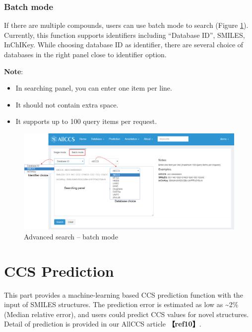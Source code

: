 \documentclass[12pt,]{book}
\providecommand{\tightlist}{%
  \setlength{\itemsep}{0pt}\setlength{\parskip}{0pt}}
\begin{document}
\subsection{Batch mode}\label{chapter2d3d2}

If there are multiple compounds, users can use batch mode to search
(Figure \ref{fig:figure2d9}). Currently, this function supports
identifiers including ``Database ID'', SMILES, InChIKey. While choosing
database ID as identifier, there are several choice of databases in the
right panel close to identifier option.

\textbf{Note}:

\begin{itemize}
\tightlist
\item
  In searching panel, you can enter one item per line.
\item
  It should not contain extra space.
\item
  It supports up to 100 query items per request.
\end{itemize}

\begin{figure}

{\centering \includegraphics{images/chapter2/figure2.9advance_search_batch} 

}

\caption{Advanced search – batch mode}\label{fig:figure2d9}
\end{figure}

\chapter{CCS Prediction}\label{chapter3}

This part provides a machine-learning based CCS prediction function with
the input of SMILES structures. The prediction error is estimated as low
as \textasciitilde{}2\% (Median relative error), and users could predict
CCS values for novel structures. Detail of prediction is provided in our
AllCCS article \textbf{【ref10】}.
\end{document}
